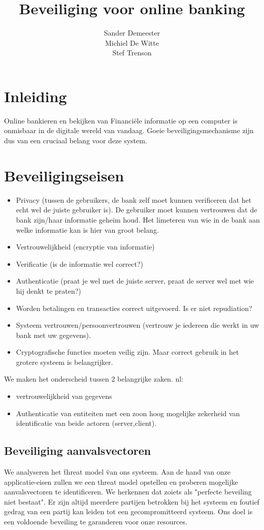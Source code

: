 \documentclass[11pt]{article}
\title{\textbf{Beveiliging voor online banking}}
\author{Sander Demeester\\
		Michiel De Witte\\
		Stef Trenson}
\date{}
\begin{document}
\maketitle

\section{Inleiding}
Online bankieren en bekijken van Financi\"ele informatie op een computer is onmisbaar in de digitale wereld van vandaag. Goeie beveiligingsmechanisme zijn dus van een cruciaal belang voor deze system. 

\section{Beveiligingseisen}
\label{sec:bev_eis}
\begin{itemize}
\item Privacy (tussen de gebruikers, de bank zelf moet kunnen verificeren dat het echt wel de juiste gebruiker is). De gebruiker moet kunnen vertrouwen dat de bank zijn/haar informatie geheim houd. Het limeteren van wie in de bank aan welke informatie kan is hier van groot belang.
\item Vertrouwelijkheid (encryptie van informatie)
\item Verificatie (is de informatie wel correct?)
\item Authenticatie (praat je wel met de juiste server, praat de server wel met wie hij denkt te praten?)
\item Worden betalingen en transacties correct uitgevoerd. Is er niet repudiation?
\item Systeem vertrouwen/persoonvertrouwen (vertrouw je iedereen die werkt in uw bank met uw gegevens).
\item Cryptografische functies moeten veilig zijn. Maar correct gebruik in het grotere systeem is belangrijker.

\end{itemize}
We maken het onderscheid tussen 2 belangrijke zaken. nl: 
\begin{itemize}
\item vertrouwelijkheid van gegevens
\item Authenticatie van entiteiten met een zoon hoog mogelijke zekerheid van identificatie van beide actoren (server,client).
\end{itemize}
\subsection{Beveiliging aanvalsvectoren}
We analyseren het \" threat model \" van ons systeem. Aan de hand van onze applicatie-eisen zullen we een threat model opstellen en proberen mogelijke aanvalsvectoren te identificeren. We herkennen dat zoiets als "perfecte beveiling niet bestaat". Er zijn altijd meerdere partijen betrokken bij het systeem en foutief gedrag van een partij kan leiden tot een gecompromitteerd systeem. Ons doel is een voldoende beveiling te garanderen voor onze resources.
\end{document}
